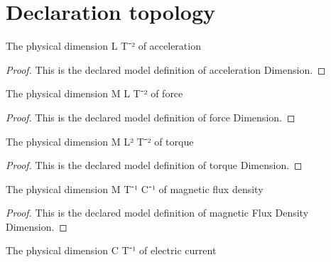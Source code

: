 \section{Declaration topology}
\begin{definition}
  \label{def:physics:phyx-mini-0951:phyxminiproblems-problemphyxmini0951-accelerationdimension}
  The physical dimension L T⁻² of acceleration
\end{definition}
\begin{proof}
  This is the declared model definition of acceleration Dimension.
\end{proof}
\begin{definition}
  \label{def:physics:phyx-mini-0951:phyxminiproblems-problemphyxmini0951-forcedimension}
  The physical dimension M L T⁻² of force
\end{definition}
\begin{proof}
  This is the declared model definition of force Dimension.
\end{proof}
\begin{definition}
  \label{def:physics:phyx-mini-0951:phyxminiproblems-problemphyxmini0951-torquedimension}
  The physical dimension M L² T⁻² of torque
\end{definition}
\begin{proof}
  This is the declared model definition of torque Dimension.
\end{proof}
\begin{definition}
  \label{def:physics:phyx-mini-0951:phyxminiproblems-problemphyxmini0951-magneticfluxdensitydimension}
  The physical dimension M T⁻¹ C⁻¹ of magnetic flux density
\end{definition}
\begin{proof}
  This is the declared model definition of magnetic Flux Density Dimension.
\end{proof}
\begin{definition}
  \label{def:physics:phyx-mini-0951:phyxminiproblems-problemphyxmini0951-electriccurrentdimension}
  The physical dimension C T⁻¹ of electric current
\end{definition}
